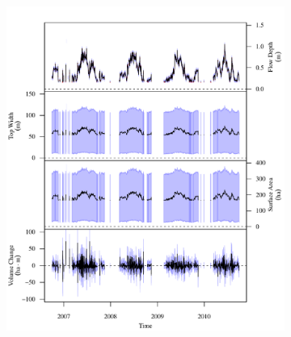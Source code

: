 \begin{landscape}
	\begin{figure}
		\begin{subfigure}{0.7\textwidth}
			\centering
			\includegraphics[width=\tableCustomSize]{"Figures/Results_USR/Stochastic/G TS C"}
		\end{subfigure}%
		\begin{subfigure}{0.7\textwidth}
			\centering			

\end{subfigure}
\end{figure}
\end{landscape}
